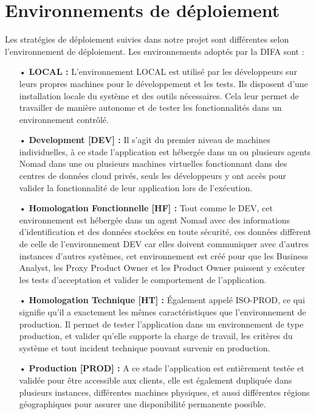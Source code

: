 \section{Environnements de déploiement}
Les stratégies de déploiement suivies dans notre projet sont différentes selon l’environnement de
déploiement. Les environnements adoptés par la DIFA sont :

\begin{itemize}
    \item[•] \textbf{LOCAL :} L’environnement LOCAL est utilisé par les développeurs sur leurs propres machines
    pour le développement et les tests. Ils disposent d’une installation locale du système et des outils
    nécessaires. Cela leur permet de travailler de manière autonome et de tester les fonctionnalités
    dans un environnement contrôlé.
    \item[•] \textbf{Development [DEV] :} Il s’agit du premier niveau de machines individuelles, à ce stade l’application est hébergée dans un ou plusieurs agents Nomad dans une ou plusieurs machines virtuelles
    fonctionnant dans des centres de données cloud privés, seuls les développeurs y ont accès pour
    valider la fonctionnalité de leur application lors de l’exécution.
    \item[•] \textbf{Homologation Fonctionnelle [HF] :} Tout comme le DEV, cet environnement est hébergée dans un agent Nomad avec des informations d’identification et des données stockées en toute sécurité,
    ces données diffèrent de celle de l’environnement DEV car elles doivent communiquer avec d’autres
    instances d’autres systèmes, cet environnement est créé pour que les Business Analyst, les Proxy
    Product Owner et les Product Owner puissent y exécuter les tests d’acceptation et valider le comportement de l’application.
    \item[•] \textbf{Homologation Technique [HT] :} Également appelé ISO-PROD, ce qui signifie qu’il a exactement les mêmes caractéristiques que l’environnement de production. Il permet de tester l’application dans un environnement de type production, et valider qu’elle supporte la charge de travail,
    les critères du système et tout incident technique pouvant survenir en production.
    \item[•] \textbf{Production [PROD] :}  A ce stade l’application est entièrement testée et validée pour être accessible aux clients, elle est également dupliquée dans plusieurs instances, différentes machines
    physiques, et aussi différentes régions géographiques pour assurer une disponibilité permanente
    possible.
\end{itemize}

